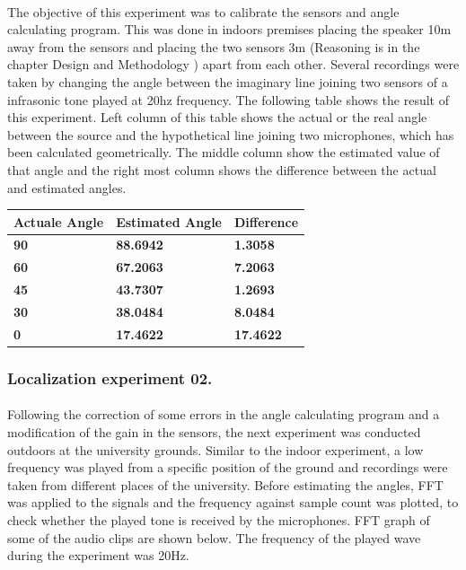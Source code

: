 \documentclass[12pt]{article}
\numberwithin{figure}{section}
\numberwithin{table}{section}
\begin{document}
\paragraph{}
The objective of this experiment was to calibrate the sensors and angle calculating program. This was done in indoors premises placing the speaker 10m away from the sensors and placing the two sensors 3m (Reasoning is in the chapter Design and Methodology ) apart from each other. Several recordings were taken by changing the angle between the imaginary line joining two sensors of a infrasonic tone played at 20hz frequency. The following table shows the result of this experiment. Left column of this table shows the actual or the real angle between the source and the hypothetical line joining two microphones, which has been calculated geometrically. The middle column show the estimated value of that angle and the right most column shows the difference between the actual and estimated angles.

\begin{table}[H]
\centering
\begin{tabular}{|m{}|m{}|m{}|} 
\hline
\bf {Actuale Angle} &  {\bf{ Estimated Angle }} & {\bf{ Difference }}\\
\hline
\hline
\bf {90} &  {\bf{ 88.6942 }} & {\bf{ 1.3058 }}\\
\hline
\bf {60} &  {\bf{ 67.2063 }} & {\bf{ 7.2063 }}\\
\hline
\bf {45} &  {\bf{ 43.7307 }} & {\bf{ 1.2693 }}\\
\hline
\bf {30} &  {\bf{ 38.0484 }} & {\bf{ 8.0484 }}\\
\hline
\bf {0} &  {\bf{ 17.4622 }} & {\bf{ 17.4622 }}\\
\hline
\end{tabular}
\end{table}

\subsubsection{Localization experiment 02.}

\paragraph{}
Following the correction of some errors in the angle calculating program and a modification of the gain in the sensors, the next experiment was conducted outdoors at the university grounds.  Similar to the indoor experiment, a low frequency was played from a specific position of the ground and recordings were taken from different places of the university.  Before estimating the angles, FFT was applied to the signals and the frequency against sample count was plotted, to check whether the played tone is received by the microphones. FFT graph of some of the audio clips are shown below. The frequency of the played wave during the experiment was 20Hz.
\end{document}
